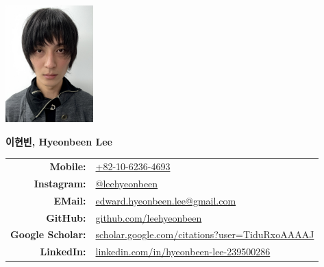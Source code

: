 \documentclass[a4paper,10pt]{extarticle}
\begin{document}
\pagestyle{empty}



\begin{minipage}{0.1\textwidth}
    \begin{flushleft}
        \includegraphics[height=4.5cm]{photo_dlicense.jpeg}
    \end{flushleft}
\end{minipage}
\hfill
\begin{minipage}{0.7\textwidth}
    \begin{flushright}
        \textbf{\Large 이현빈, Hyeonbeen Lee} %
        \newline\newline
        \begin{tabular}{rl}
            \textbf{Mobile: }         & \href{tel:+82-10-6236-4693}{+82-10-6236-4693}                                                                                              \\
            \textbf{Instagram: }      & \href{https://www.instagram.com/leehyeonbeen}{@leehyeonbeen}                                                  \\
            \textbf{EMail: }          & \href{mailto:edward.hyeonbeen.lee@gmail.com}{edward.hyeonbeen.lee@gmail.com}                                  \\
            \textbf{GitHub: }         & \href{https://github.com/leehyeonbeen}{github.com/leehyeonbeen}                                               \\
            \textbf{Google Scholar: } & \href{https://scholar.google.com/citations?user=TiduRxoAAAAJ}{scholar.google.com/citations?user=TiduRxoAAAAJ} \\
            \textbf{LinkedIn: }       & \href{https://www.linkedin.com/in/hyeonbeen-lee-239500286/}{linkedin.com/in/hyeonbeen-lee-239500286}
        \end{tabular}
    \end{flushright}

\end{minipage}
\end{document}
